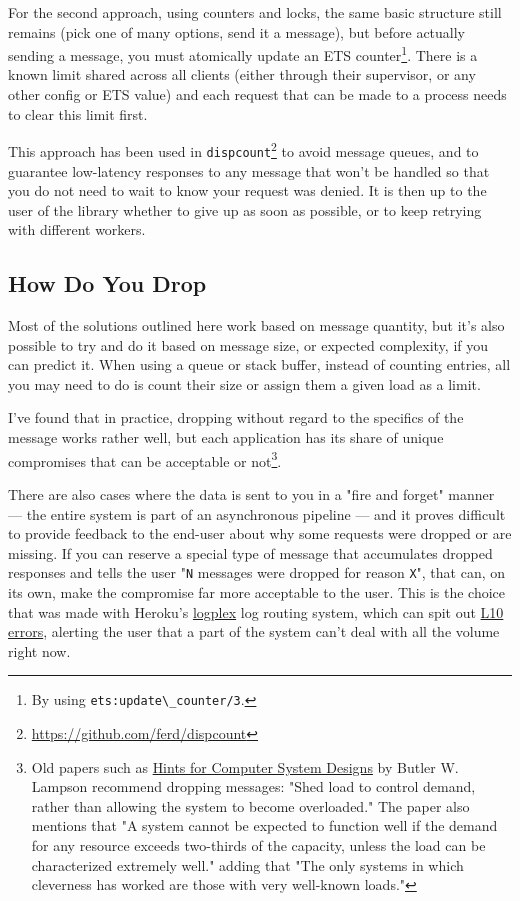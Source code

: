 \documentclass[11pt, oneside]{book}   	%
\newcommand{\module}[1]{\Verb`#1`}
\newcommand{\function}[1]{\Verb`#1`}
\newcommand{\var}[1]{\Verb`#1`}
\begin{document}
For the second approach, using counters and locks, the same basic structure still remains (pick one of many options, send it a message), but before actually sending a message, you must atomically update an ETS counter\footnote{By using \function{ets:update\_counter/3}.}. There is a known limit shared across all clients (either through their supervisor, or any other config or ETS value) and each request that can be made to a process needs to clear this limit first.

This approach has been used in \module{dispcount}\footnote{\href{https://github.com/ferd/dispcount}{https://github.com/ferd/dispcount}} to avoid message queues, and to guarantee low-latency responses to any message that won't be handled so that you do not need to wait to know your request was denied. It is then up to the user of the library whether to give up as soon as possible, or to keep retrying with different workers.

\subsection{How Do You Drop}

Most of the solutions outlined here work based on message quantity, but it's also possible to try and do it based on message size, or expected complexity, if you can predict it. When using a queue or stack buffer, instead of counting entries, all you may need to do is count their size or assign them a given load as a limit.

I've found that in practice, dropping without regard to the specifics of the message works rather well, but each application has its share of unique compromises that can be acceptable or not\footnote{Old papers such as \href{http://research.microsoft.com/en-us/um/people/blampson/33-hints/webpage.html}{Hints for Computer System Designs} by Butler W. Lampson recommend dropping messages: "Shed load to control demand, rather than allowing the system to become overloaded." The paper also mentions that  "A system cannot be expected to function well if the demand for any resource exceeds two-thirds of the capacity, unless the load can be characterized extremely well." adding that "The only systems in which cleverness has worked are those with very well-known loads."}.

There are also cases where the data is sent to you in a "fire and forget" manner — the entire system is part of an asynchronous pipeline — and it proves difficult to provide feedback to the end-user about why some requests were dropped or are missing. If you can reserve a special type of message that accumulates dropped responses and tells the user "\var{N} messages were dropped for reason \var{X}", that can, on its own, make the compromise far more acceptable to the user. This is the choice that was made with Heroku's \href{https://devcenter.heroku.com/articles/logplex}{logplex} log routing system, which can spit out \href{https://devcenter.heroku.com/articles/error-codes\#l10-drain-buffer-overflow}{L10 errors}, alerting the user that a part of the system can't deal with all the volume right now.
\end{document}
